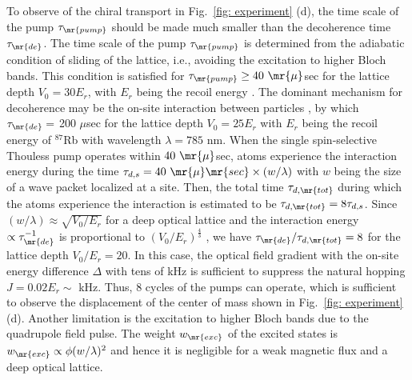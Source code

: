 \documentclass[
floatfix,
pra,
twocolumn,
reprint,
amsmath,amssymb,
aps,
footnote,
]{revtex4}
\begin{document}
To observe of the chiral transport in Fig.~\ref{fig: experiment} (d), the time scale of the pump $\tau_{\mr{pump}}$ should be made much smaller than the decoherence time $\tau_{\mr{de}}$.
The time scale of the pump $\tau_{\mr{pump}}$ is determined from the adiabatic condition of sliding of the lattice, i.e., avoiding the excitation to higher Bloch bands.
This condition is satisfied for $\tau_{\mr{pump}} \ge 40 \ \mr{\mu}$sec for the lattice depth $V_0 = 30 E_r$, with $E_r$ being the recoil energy \cite{Mandel03a, Mandel03b}.
The dominant mechanism for decoherence may be the on-site interaction between particles \cite{Mandel03a}, by which $\tau_{\mr{de}} = $ 200 $\mu$sec for the lattice depth $V_0 = 25 E_r$ with $E_r$ being the recoil energy of ${}^{87}$Rb with wavelength $\lambda = 785$ nm.
When the single spin-selective Thouless pump operates within $40 \ \mr{\mu}$sec, atoms experience the interaction energy during the time $\tau_{d,s} = 40 \ \mr{\mu}\mr{sec} \times (w/\lambda)$ with $w$ being the size of a wave packet localized at a site.
Then, the total time $\tau_{d,\mr{tot}}$ during which the atoms experience the interaction is estimated to be $\tau_{d,\mr{tot}} = 8 \tau_{d,s}$.
Since $(w/\lambda) \approx \sqrt{V_0/E_r}$ for a deep optical lattice and the interaction energy $\propto \tau_{\mr{de}}^{-1}$ is proportional to $(V_0/E_r)^{\frac{4}{3}}$ \cite{Bloch08}, we have $\tau_{\mr{de}}/\tau_{d, \mr{tot}} = 8$ for the lattice depth $V_0 / E_r = 20$.
In this case, the optical field gradient with the on-site energy difference $\Delta$ with tens of kHz is sufficient to suppress the natural hopping $J = 0.02 E_r \sim $ kHz.
Thus, 8 cycles of the pumps can operate, which is sufficient to observe the displacement of the center of mass shown in Fig.~\ref{fig: experiment} (d).
Another limitation is the excitation to higher Bloch bands due to the quadrupole field pulse.
The weight $w_{\mr{exc}}$ of the excited states is $w_{\mr{exc}} \propto \phi (w/\lambda)^2$ \cite{Sorensen05} and hence it is negligible for a weak magnetic flux and a deep optical lattice.

\end{document}
